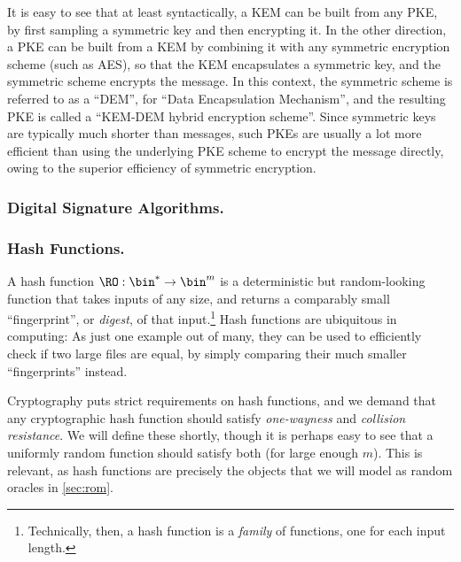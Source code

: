       \noindent
      It is easy to see that at least syntactically, a KEM can be built from any PKE, by first sampling
        a symmetric key and then encrypting it. 
        In the other direction, a PKE can be built
        from a KEM by combining it with any symmetric encryption scheme (such as
        AES), so that the KEM encapsulates a symmetric key, and the symmetric
        scheme encrypts the message. In this context, the symmetric scheme
        is referred to as a ``DEM'', for ``Data Encapsulation Mechanism'',
        and the resulting PKE is called a ``KEM-DEM hybrid encryption scheme''.
        Since symmetric keys are typically much shorter than messages,
        such PKEs are usually a lot more efficient than using the underlying PKE
        scheme to encrypt the message directly, 
        owing to the superior efficiency of symmetric encryption.
	    
    \subsubsection{Digital Signature Algorithms.}

    \subsubsection{Hash Functions.}
      A hash function $\RO: \bin^* \to \bin^m$ is a deterministic but random-looking 
        function that takes inputs of any size, and returns a comparably small
        ``fingerprint'', or \emph{digest}, of that input.\footnote{
          Technically, then, a hash function is a \emph{family} of functions,
          one for each input length.
        } Hash functions are ubiquitous in computing: As just one example out of
        many, they can be used to efficiently check if two large files are
        equal, by simply comparing their much smaller ``fingerprints'' instead.

      Cryptography puts strict requirements on hash functions, and we
        demand that any cryptographic hash function should satisfy
        \emph{one-wayness} and \emph{collision resistance}. We will define these
        shortly, though it is perhaps easy to see that a uniformly random
        function should satisfy both (for large enough $m$). This is relevant,
        as hash functions are precisely the objects that we will model as
        random oracles in \cref{sec:rom}.

